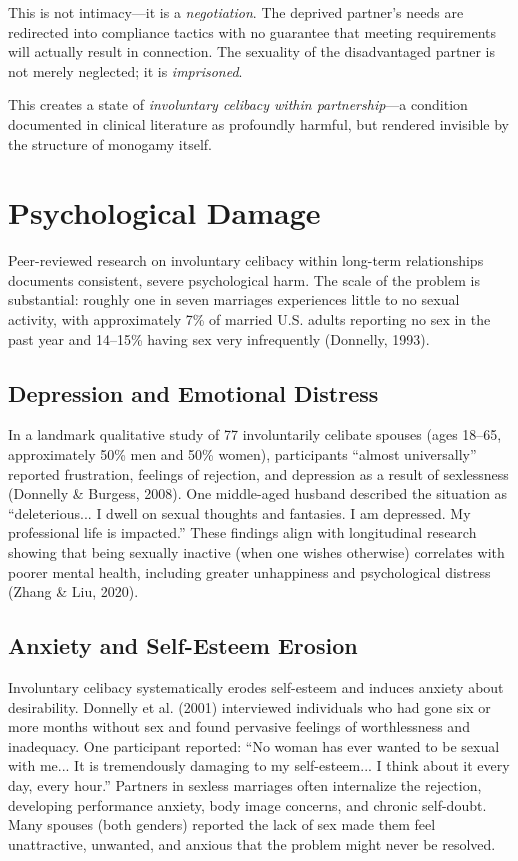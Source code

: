 \documentclass[12pt,openany]{book}
\numberwithin{equation}{chapter}
\begin{document}
This is not intimacy---it is a \textit{negotiation}. The deprived partner's needs are redirected into compliance tactics with no guarantee that meeting requirements will actually result in connection. The sexuality of the disadvantaged partner is not merely neglected; it is \textit{imprisoned}.

This creates a state of \textit{involuntary celibacy within partnership}---a condition documented in clinical literature as profoundly harmful, but rendered invisible by the structure of monogamy itself.

\section{Psychological Damage}

Peer-reviewed research on involuntary celibacy within long-term relationships documents consistent, severe psychological harm. The scale of the problem is substantial: roughly one in seven marriages experiences little to no sexual activity, with approximately 7\% of married U.S. adults reporting no sex in the past year and 14--15\% having sex very infrequently (Donnelly, 1993).

\subsection{Depression and Emotional Distress}

In a landmark qualitative study of 77 involuntarily celibate spouses (ages 18--65, approximately 50\% men and 50\% women), participants ``almost universally'' reported frustration, feelings of rejection, and depression as a result of sexlessness (Donnelly \& Burgess, 2008). One middle-aged husband described the situation as ``deleterious... I dwell on sexual thoughts and fantasies. I am depressed. My professional life is impacted.'' These findings align with longitudinal research showing that being sexually inactive (when one wishes otherwise) correlates with poorer mental health, including greater unhappiness and psychological distress (Zhang \& Liu, 2020).

\subsection{Anxiety and Self-Esteem Erosion}

Involuntary celibacy systematically erodes self-esteem and induces anxiety about desirability. Donnelly et al. (2001) interviewed individuals who had gone six or more months without sex and found pervasive feelings of worthlessness and inadequacy. One participant reported: ``No woman has ever wanted to be sexual with me... It is tremendously damaging to my self-esteem... I think about it every day, every hour.'' Partners in sexless marriages often internalize the rejection, developing performance anxiety, body image concerns, and chronic self-doubt. Many spouses (both genders) reported the lack of sex made them feel unattractive, unwanted, and anxious that the problem might never be resolved.
\end{document}
